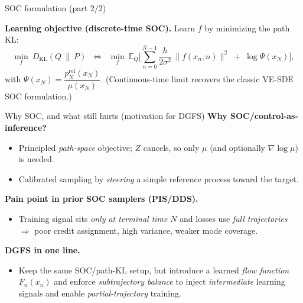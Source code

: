 \documentclass[aspectratio=169,xcolor=dvipsnames]{beamer}
\begin{document}
\begin{frame}[t]{SOC formulation (part 2/2)}
\footnotesize

\medskip
\textbf{Learning objective (discrete-time SOC).} Learn $f$ by minimizing the path KL:
\[
\min_{f}\ D_{\mathrm{KL}}(Q\ \|\ P)
\;\;\Longleftrightarrow\;\;
\min_{f}\ \mathbb E_{Q}\!\Big[\sum_{n=0}^{N-1}\frac{h}{2\sigma^2}\,\|f(x_n,n)\|^2\;+\;\log\Psi(x_N)\Big],
\]
with \(\Psi(x_N)=\dfrac{p_N^{\text{ref}}(x_N)}{\mu(x_N)}\).
(Continuous-time limit recovers the classic VE-SDE SOC formulation.)
\end{frame}

\begin{frame}[t]{Why SOC, and what still hurts (motivation for DGFS)}
\footnotesize
\textbf{Why SOC/control-as-inference?}
\begin{itemize}\itemsep3pt
  \item Principled \emph{path-space} objective; $Z$ cancels, so only $\mu$ (and optionally $\nabla\log\mu$) is needed.
  \item Calibrated sampling by \emph{steering} a simple reference process toward the target.
\end{itemize}

\textbf{Pain point in prior SOC samplers (PIS/DDS).}
\begin{itemize}\itemsep3pt
  \item Training signal sits \emph{only at terminal time} $N$ and losses use \emph{full trajectories} $\Rightarrow$ poor credit assignment, high variance, weaker mode coverage.
\end{itemize}

\textbf{DGFS in one line.}
\begin{itemize}\itemsep3pt
  \item Keep the same SOC/path-KL setup, but introduce a learned \emph{flow function} $F_n(x_n)$ and enforce \emph{subtrajectory balance} to inject \emph{intermediate} learning signals and enable \emph{partial-trajectory} training.
\end{itemize}
\end{frame}



\end{document}
